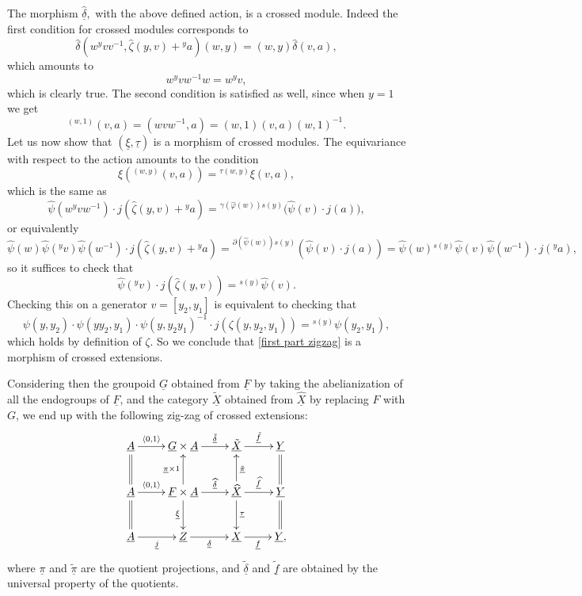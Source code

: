 \documentclass[11pt]{amsart}
\theoremstyle{plain}
\theoremstyle{definition}
\theoremstyle{remark}
\newcommand{\un}{\underline}
\begin{document}
The morphism $\un{\widehat{\delta}},$ with the above defined action, is a crossed module. Indeed the first condition for crossed modules corresponds to
\[\widehat{\delta} (w {}^{y}v v^{-1}, \widehat{\zeta}(y,v) + {}^{y}a) (w,y) = (w,y)\widehat{\delta}(v,a),\]
which amounts to
\[w^{y}v w^{-1}w = w{}^{y}v,\]
which is clearly true. The second condition is satisfied as well, since when $y=1$ we get
\[{}^{(w,1)} (v,a) = (w vw^{-1},a) = (w,1)(v,a)(w,1)^{-1}.\]
Let us now show that $(\un{\xi}, \un{\tau})$ is a morphism of crossed modules. The equivariance with respect to the action amounts to the condition
\[\xi({}^{(w,y)} (v,a)) = {}^{\tau (w,y)} \xi(v,a),\]
which is the same as
\[\widehat{\psi} (w{}^y vw^{-1}) \cdot j (\widehat{\zeta}(y,v) + {}^{y}a) = {}^{\gamma(\widehat{\varphi}(w))s(y)} \big(\widehat{\psi}(v) \cdot j(a)\big),\]
or equivalently
\[\widehat{\psi} (w) \widehat{\psi}({}^y v ) \widehat{\psi}(w^{-1}) \cdot j (\widehat{\zeta}(y,v) + {}^{y}a) = {}^{\partial(\widehat{\psi}(w))s(y)} (\widehat{\psi}(v) \cdot j(a) ) = \widehat{\psi} (w) {}^{s(y)}\widehat{\psi}(v) \widehat{\psi}(w^{-1}) \cdot j ({}^{y}a),\]
so it suffices to check that
\[\widehat{\psi}({}^y v ) \cdot j (\widehat{\zeta}(y,v)) = {}^{s(y)}\widehat{\psi}(v).\]
Checking this on a generator $v=[y_2,y_1]$ is equivalent to checking that
\[\psi(y,y_2) \cdot \psi (yy_2,y_1) \cdot \psi(y,y_2y_1)^{-1} \cdot j(\zeta(y,y_2,y_1)) = {}^{s(y)} \psi(y_2,y_1),\]
which holds by definition of $\zeta.$ So we conclude that \eqref{first part zigzag} is a morphism of crossed extensions.

Considering then the groupoid $\un{G}$ obtained from $\un{F}$ by taking the abelianization of all the endogroups of $\un{F}$, and the category $\un{\tilde{X}}$ obtained from $\un{\widehat{X}}$ by replacing $F$ with $G$, we end up with the following zig-zag of crossed extensions:
\[ \xymatrix{ \un{A} \ar[r]^-{\langle 0, 1 \rangle} & \un{G} \times \un{A} \ar[r]^-{\un{\tilde{\delta}}} & \un{\tilde{X}} \ar[r]^{\un{\tilde{f}}} & \un{Y} \\
\un{A} \ar@{=}[d] \ar@{=}[u] \ar[r]^-{\langle 0, 1 \rangle} & \un{F} \times \un{A} \ar[d]_{\un{\xi}} \ar[u]^{\un{\pi} \times 1} \ar[r]^-{\un{\widehat{\delta}}} & \un{\widehat{X}} \ar[d]^{\un{\tau}} \ar[u]_{\un{\tilde{\pi}}} \ar[r]^{\un{\widehat{f}}} & \un{Y} \ar@{=}[d] \ar@{=}[u] \\
{\un{A}} \ar[r]_{\un{j}} &{\un{Z}} \ar[r]_-{\un{\delta}} &{\un{X}} \ar[r]_-{\un{f}} &{\un{Y},}
} \]
where $\un{\pi}$ and $\un{\tilde{\pi}}$ are the quotient projections, and $\un{\tilde{\delta}}$ and $\un{\tilde{f}}$ are obtained by the universal property of the quotients.
\end{document}
